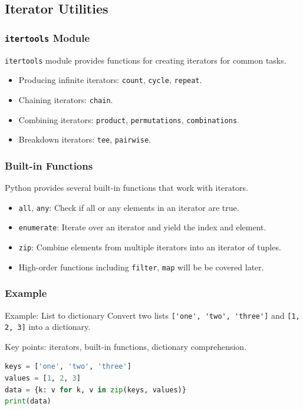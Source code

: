 \documentclass[beamer, en, version=2.0]{huangfusl-template}
\begin{document}
    \subsection{Iterator Utilities}
    \begin{frame}[fragile]
        \frametitle{{\normalsize\texttt{itertools}} Module}

        {\footnotesize\verb|itertools|} module provides functions for creating iterators for common tasks.

        \begin{itemize}
            \item Producing infinite iterators: {\footnotesize\verb|count|}, {\footnotesize\verb|cycle|}, {\footnotesize\verb|repeat|}.
            \item Chaining iterators: {\footnotesize\verb|chain|}.
            \item Combining iterators: {\footnotesize\verb|product|}, {\footnotesize\verb|permutations|}, {\footnotesize\verb|combinations|}.
            \item Breakdown iterators: {\footnotesize\verb|tee|}, {\footnotesize\verb|pairwise|}.
        \end{itemize}
    \end{frame}
    \begin{frame}[fragile]
        \frametitle{Built-in Functions}

        Python provides several built-in functions that work with iterators.

        \begin{itemize}
            \item {\footnotesize\verb|all|}, {\footnotesize\verb|any|}: Check if all or any elements in an iterator are true.
            \item {\footnotesize\verb|enumerate|}: Iterate over an iterator and yield the index and element.
            \item {\footnotesize\verb|zip|}: Combine elements from multiple iterators into an iterator of tuples.
            \item High-order functions including {\footnotesize\verb|filter|}, {\footnotesize\verb|map|} will be be covered later.
        \end{itemize}
    \end{frame}
    \begin{frame}[fragile]
        \frametitle{Example}

        \begin{block}{Example: List to dictionary}
            Convert two lists {\footnotesize\verb|['one', 'two', 'three']|} and {\footnotesize\verb|[1, 2, 3]|} into a dictionary.
        \end{block}

        Key points: iterators, built-in functions, dictionary comprehension.

        \pause

\begin{lstlisting}[language=python]
keys = ['one', 'two', 'three']
values = [1, 2, 3]
data = {k: v for k, v in zip(keys, values)}
print(data)
\end{lstlisting}

    \end{frame}
\end{document}
